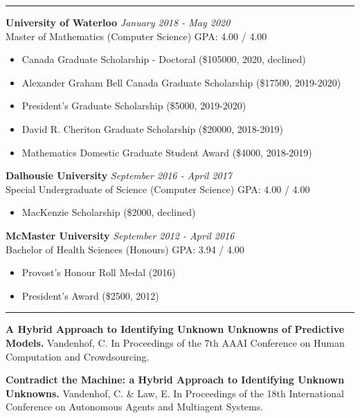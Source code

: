 \documentclass[letterpaper,10pt]{article}
\newenvironment{rsection}[1]{%
  \Needspace{5\baselineskip}\vspace{6pt}{\bfseries\MakeUppercase{#1}}\par\vspace{2pt}\hrule\vspace{4pt}
  \begin{list}{}{\setlength{\leftmargin}{1.5em}\setlength{\itemsep}{5pt}\setlength{\parsep}{0pt}\setlength{\topsep}{0pt}}
}{\end{list}}
\begin{document}
\begin{rsection}{Education}
\item[] {\bfseries University of Waterloo} \hfill {\itshape January 2018 - May 2020}\\
  Master of Mathematics (Computer Science) \hfill GPA: 4.00 / 4.00
  \begin{itemize}
    \item Canada Graduate Scholarship - Doctoral (\$105000, 2020, declined)
    \item Alexander Graham Bell Canada Graduate Scholarship (\$17500, 2019-2020)
    \item President's Graduate Scholarship (\$5000, 2019-2020)
    \item David R. Cheriton Graduate Scholarship (\$20000, 2018-2019)
    \item Mathematics Domestic Graduate Student Award (\$4000, 2018-2019)
  \end{itemize}

\item[] {\bfseries Dalhousie University} \hfill {\itshape September 2016 - April 2017}\\
  Special Undergraduate of Science (Computer Science) \hfill GPA: 4.00 / 4.00
  \begin{itemize}
    \item MacKenzie Scholarship (\$2000, declined)
  \end{itemize}

\item[] {\bfseries McMaster University} \hfill {\itshape September 2012 - April 2016}\\
  Bachelor of Health Sciences (Honours) \hfill GPA: 3.94 / 4.00
  \begin{itemize}
    \item Provost's Honour Roll Medal (2016)
    \item President's Award (\$2500, 2012)
  \end{itemize}
\end{rsection}

\begin{rsection}{Publications}
\item[] {\bfseries A Hybrid Approach to Identifying Unknown Unknowns of Predictive Models.} Vandenhof, C. In Proceedings of the 7th AAAI Conference on Human Computation and Crowdsourcing.

\item[] {\bfseries Contradict the Machine: a Hybrid Approach to Identifying Unknown Unknowns.} Vandenhof, C. \& Law, E. In Proceedings of the 18th International Conference on Autonomous Agents and Multiagent Systems.
\end{rsection}
\end{document}
